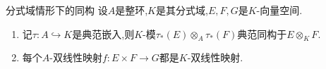 \begin{remark}{分式域情形下的同构}{}
	设$A$是整环,$K$是其分式域,$E,F,G$是$K$-向量空间.
	\begin{enumerate}
		\item 记$\tau:A\hookrightarrow K$是典范嵌入,则$K$-模$\tau_{\ast}\left(E\right)\otimes_{A}\tau_{\ast}\left(F\right)$典范同构于$E\otimes_{K}F$.
		\item 每个$A$-双线性映射$f:E\times F\to G$都是$K$-双线性映射.
	\end{enumerate}
\end{remark}





























































